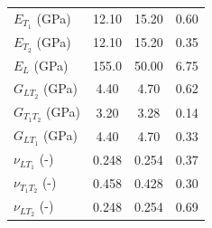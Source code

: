 \documentclass[review]{elsarticle}
\begin{document}
\begin{description}
\begin{table}[!htbp]
\begin{tabular}{l c c c }
\hline %

$E_{T_1}$ (GPa) & 12.10 & 15.20 & 0.60\\
$E_{T_2}$ (GPa) & 12.10 & 15.20 & 0.35\\
$E_L$ (GPa) & 155.0 & 50.00 & 6.75\\

$G_{LT_2}$ (GPa) & 4.40 & 4.70 & 0.62\\
$G_{T_1T_2}$ (GPa) & 3.20 & 3.28 & 0.14\\
$G_{LT_1}$ (GPa) & 4.40 & 4.70 & 0.33\\

$\nu_{LT_1}$ (-) & 0.248 & 0.254 & 0.37\\
$\nu_{T_1T_2}$ (-) & 0.458 & 0.428 & 0.30\\
$\nu_{LT_2}$ (-) & 0.248 & 0.254 & 0.69\\





\hline %
\end{tabular}
\label{table:nonlin} %
\end{table}
\end{description}




\pagebreak
\end{document}
